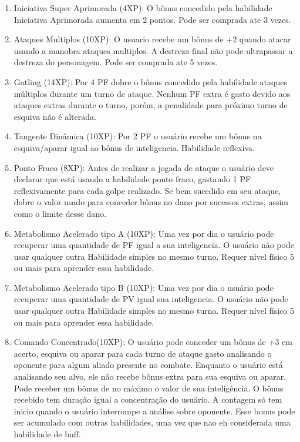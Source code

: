 \begin{enumerate}
	\item Iniciativa Super Aprimorada (4XP): O bônus concedido pela habilidade Iniciativa Aprimorada aumenta em 2 pontos. Pode ser comprada ate 3 vezes.

	\item Ataques Multiplos (10XP): O usuario recebe um bônus de +2 quando atacar usando a manobra ataques multiplos. A destreza final não pode ultrapassar a destreza do personagem. Pode ser comprada ate 5 vezes. 
	
	\item Gatling (14XP): Por 4 PF dobre o bônus concedido pela habilidade ataques múltiplos durante um turno de ataque. Nenhum PF extra é gasto devido aos ataques extras durante o turno, porém, a penalidade para próximo turno de esquiva não é alterada.	

	\item Tangente Dinâmica (10XP): Por 2 PF o usuário recebe um bônus na esquiva/aparar igual ao bônus de inteligencia. Habilidade reflexiva.

	\item Ponto Fraco (8XP): Antes de realizar a jogada de ataque o usuário deve declarar que está usando a habilidade ponto fraco, gastando 1 PF reflexivamente para cada golpe realizado. Se bem sucedido em seu ataque, dobre o valor usado para conceder bônus no dano por sucessos extras, assim como o limite desse dano.
 
	\item Metabolismo Acelerado tipo A (10XP): Uma vez por dia o usuário pode recuperar uma quantidade de PF igual a sua inteligencia. O usuário não pode usar qualquer outra Habilidade simples no mesmo turno. Requer nível físico 5 ou mais para aprender essa habilidade. 

	\item Metabolismo Acelerado tipo B (10XP): Uma vez por dia o usuário pode recuperar uma quantidade de PV igual sua inteligencia. O usuário não pode usar qualquer outra Habilidade simples no mesmo turno. Requer nível físico 5 ou mais para aprender essa habilidade. 
 	 
	\item Comando Concentrado(10XP): O usuário pode conceder um bônus de +3 em acerto, esquiva ou aparar para cada turno de ataque gasto analisando o oponente para algum aliado presente no combate. Enquanto o usuário está analisando seu alvo, ele não recebe bônus extra para sua esquiva ou aparar. Pode receber um bônus de no máximo o valor de sua inteligência. O bônus recebido tem duração igual a concentração do usuário. A contagem só tem inicio quando o usuário interrompe a análise sobre oponente. Esse bonus pode ser acumulado com outras habilidades, uma vez que nao eh considerada uma habilidade de buff.
 

\end{enumerate}
